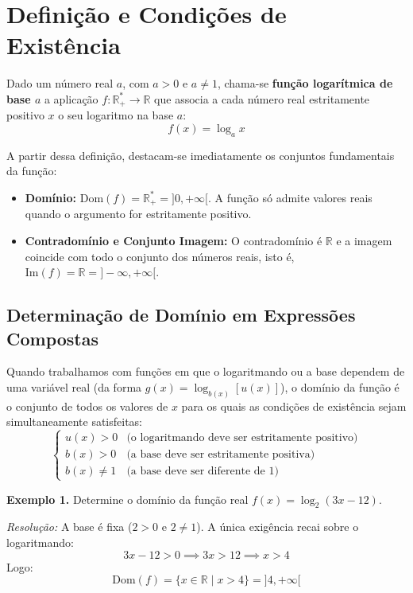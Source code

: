 \documentclass[12pt,a4paper]{report}
\begin{document}
	\section{Definição e Condições de Existência}
	
	\begin{destaque}
		Dado um número real $a$, com $a > 0$ e $a \neq 1$, chama-se \textbf{função logarítmica de base $a$} a aplicação $f \colon \mathbb{R}^*_+ \to \mathbb{R}$ que associa a cada número real estritamente positivo $x$ o seu logaritmo na base $a$:
		$$f(x) = \log_a x$$
	\end{destaque}
	
	A partir dessa definição, destacam-se imediatamente os conjuntos fundamentais da função:
	\begin{itemize}[label=$\circ$]
		\item \textbf{Domínio:} $\text{Dom}(f) = \mathbb{R}^*_+ = {]0, +\infty[}$. A função só admite valores reais quando o argumento for estritamente positivo.
		\item \textbf{Contradomínio e Conjunto Imagem:} O contradomínio é $\mathbb{R}$ e a imagem coincide com todo o conjunto dos números reais, isto é, $\text{Im}(f) = \mathbb{R} = {]-\infty, +\infty[}$.
	\end{itemize}
	
	\subsection*{Determinação de Domínio em Expressões Compostas}
	
	Quando trabalhamos com funções em que o logaritmando ou a base dependem de uma variável real (da forma $g(x) = \log_{b(x)} [u(x)]$), o domínio da função é o conjunto de todos os valores de $x$ para os quais as condições de existência sejam simultaneamente satisfeitas:
	$$\begin{cases}
		u(x) > 0 & \text{(o logaritmando deve ser estritamente positivo)} \\
		b(x) > 0 & \text{(a base deve ser estritamente positiva)} \\
		b(x) \neq 1 & \text{(a base deve ser diferente de $1$)}
	\end{cases}$$
	
	\textbf{Exemplo 1.} Determine o domínio da função real $f(x) = \log_2 (3x - 12)$.
	
	\textit{Resolução:}  
	A base é fixa ($2 > 0$ e $2 \neq 1$). A única exigência recai sobre o logaritmando:
	$$3x - 12 > 0 \implies 3x > 12 \implies x > 4$$
	Logo:
	$$\text{Dom}(f) = \{x \in \mathbb{R} \mid x > 4\} = {]4, +\infty[}$$
	
\end{document}
